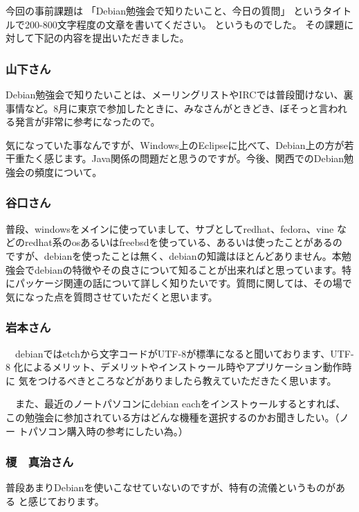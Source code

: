 \documentclass[mingoth,a4paper]{jsarticle}
\begin{document}
今回の事前課題は
「Debian勉強会で知りたいこと、今日の質問」
というタイトルで200-800文字程度の文章を書いてください。
というものでした。
その課題に対して下記の内容を提出いただきました。

\subsubsection{山下さん}

Debian勉強会で知りたいことは、メーリングリストやIRCでは普段聞けない、裏
事情など。8月に東京で参加したときに、みなさんがときどき、ぼそっと言われ
る発言が非常に参考になったので。

気になっていた事なんですが、Windows上のEclipseに比べて、Debian上の方が若
干重たく感じます。Java関係の問題だと思うのですが。今後、関西でのDebian勉
強会の頻度について。

\subsubsection{谷口さん}

普段、windowsをメインに使っていまして、サブとしてredhat、fedora、vine な
どのredhat系のosあるいはfreebsdを使っている、あるいは使ったことがあるの
ですが、debianを使ったことは無く、debianの知識はほとんどありません。本勉
強会でdebianの特徴やその良さについて知ることが出来ればと思っています。特
にパッケージ関連の話について詳しく知りたいです。質問に関しては、その場で
気になった点を質問させていただくと思います。

\subsubsection{岩本さん}

　debianではetchから文字コードがUTF-8が標準になると聞いております、UTF-8
化によるメリット、デメリットやインストゥール時やアプリケーション動作時に
気をつけるべきところなどがありましたら教えていただきたく思います。

　また、最近のノートパソコンにdebian eachをインストゥールするとすれば、
この勉強会に参加されている方はどんな機種を選択するのかお聞きしたい。（ノー
トパソコン購入時の参考にしたい為。）

\subsubsection{榎　真治さん}

普段あまりDebianを使いこなせていないのですが、特有の流儀というものがある
と感じております。
\end{document}
